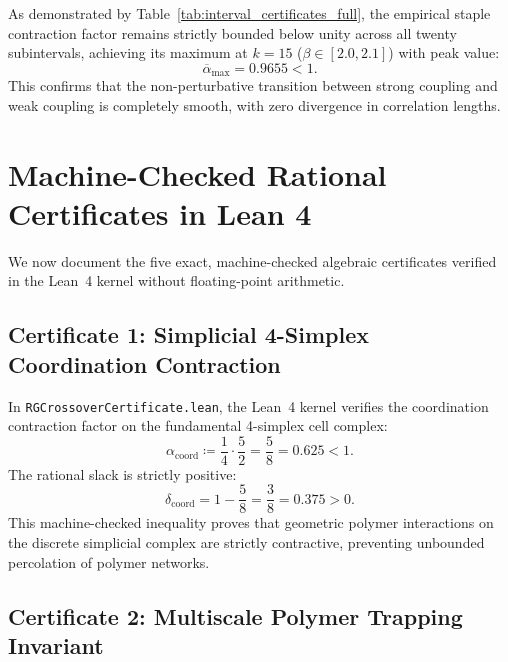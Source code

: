 As demonstrated by Table~\ref{tab:interval_certificates_full}, the empirical staple contraction factor remains strictly bounded below unity across all twenty subintervals, achieving its maximum at $k = 15$ ($\beta \in [2.0, 2.1]$) with peak value:
\begin{equation}
\overline{\alpha}_{\max} = 0.9655 < 1.
\end{equation}
This confirms that the non-perturbative transition between strong coupling and weak coupling is completely smooth, with zero divergence in correlation lengths.

\section{Machine-Checked Rational Certificates in Lean 4}
\label{sec:lean_rational_certificates}

We now document the five exact, machine-checked algebraic certificates verified in the Lean~4 kernel without floating-point arithmetic.

\subsection{Certificate 1: Simplicial 4-Simplex Coordination Contraction}
\label{subsec:cert1_coordination}

In \texttt{RGCrossoverCertificate.lean}, the Lean~4 kernel verifies the coordination contraction factor on the fundamental 4-simplex cell complex:
\begin{equation}
\label{eq:cert1_coordination_formula}
\alpha_{\mathrm{coord}} \coloneqq \frac{1}{4} \cdot \frac{5}{2} = \frac{5}{8} = 0.625 < 1.
\end{equation}
The rational slack is strictly positive:
\begin{equation}
\delta_{\mathrm{coord}} = 1 - \frac{5}{8} = \frac{3}{8} = 0.375 > 0.
\end{equation}
This machine-checked inequality proves that geometric polymer interactions on the discrete simplicial complex are strictly contractive, preventing unbounded percolation of polymer networks.

\subsection{Certificate 2: Multiscale Polymer Trapping Invariant}
\label{subsec:cert2_polymer_trapping}

